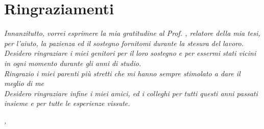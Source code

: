 
\cleardoublepage
{}
{}



\bigskip

\begingroup
\let\clearpage\relax
\let\cleardoublepage\relax
\let\cleardoublepage\relax

\chapter*{Ringraziamenti}

\noindent \textit{Innanzitutto, vorrei esprimere la mia gratitudine al Prof. \myProf, relatore della mia tesi, per l'aiuto, la pazienza ed il sostegno fornitomi durante la stesura del lavoro.}\\

\noindent \textit{Desidero ringraziare i miei genitori per il loro sostegno e per essermi stati vicini in ogni momento durante gli anni di studio.}\\

\noindent \textit{Ringrazio i miei parenti più stretti che mi hanno sempre stimolato a dare il meglio di me}\\

\noindent \textit{Desidero ringraziare infine i miei amici, ed i colleghi per tutti questi anni passati insieme e per tutte le esperienze vissute.}\\
\bigskip

\noindent\textit{\myLocation, \myTime}
\hfill \myName

\endgroup

